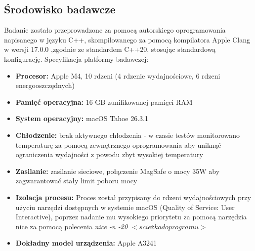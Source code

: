 \documentclass{article}
\begin{document}
    \subsection{Środowisko badawcze}
      Badanie zostało przeprowadzone za pomocą autorskiego oprogramowania napisanego w języku C++, skompilowanego za pomocą kompilatora Apple Clang w wersji 17.0.0 ,zgodnie ze standardem C++20, stosując standardową konfigurację.
      Specyfikacja platformy badawczej:
      \begin{itemize}
        \item \textbf{Procesor:} Apple M4, 10 rdzeni (4 rdzenie wydajnościowe, 6 rdzeni energooszczędnych)
      \item \textbf{Pamięć operacyjna:} 16 GB zunifikowanej pamięci RAM
      \item \textbf{System operacyjny:} macOS Tahoe 26.3.1
        \item \textbf{Chłodzenie:} brak aktywnego chłodzenia - w czasie testów monitorowano temperaturę za pomocą zewnętrznego oprogramowania aby uniknąć ograniczenia wydajności z powodu zbyt wysokiej temperatury
      \item \textbf{Zasilanie:} zasilanie sieciowe, połączenie MagSafe o mocy 35W aby zagwarantować stały limit poboru mocy
        \item \textbf{Izolacja procesu:} Proces został przypisany do rdzeni wydajnościowych przy użyciu narzędzi dostępnych w systemie macOS (Quality of Service: User Interactive), poprzez nadanie mu wysokiego priorytetu za pomocą narzędzia nice za pomocą polecenia \textit{nice -n -20 $<scieżka do programu>$} 
        \item \textbf{Dokładny model urządzenia:} Apple A3241
      \end{itemize}
\end{document}

